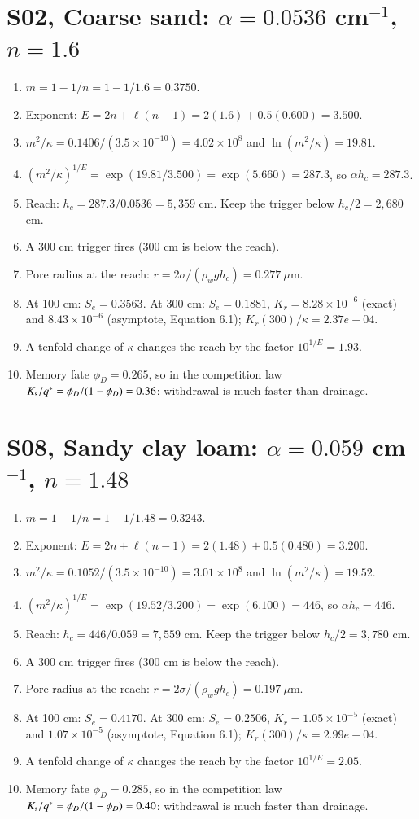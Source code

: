 \section{S02, Coarse sand: $\alpha=0.0536$ cm$^{-1}$, $n=1.6$}
\begin{enumerate}[leftmargin=*,itemsep=1pt]
\item $m=1-1/n=1-1/1.6=0.3750$.
\item Exponent: $E=2n+\ell(n-1)=2(1.6)+0.5(0.600)=3.500$.
\item $m^2/\kappa=0.1406/(3.5\times10^{-10})=4.02\times10^{8}$ and $\ln(m^2/\kappa)=19.81$.
\item $(m^2/\kappa)^{1/E}=\exp(19.81/3.500)=\exp(5.660)=287.3$, so $\alpha h_c=287.3$.
\item Reach: $h_c=287.3/0.0536=5,359$ cm. Keep the trigger below $h_c/2=2,680$ cm.
\item A 300 cm trigger fires (300 cm is below the reach).
\item Pore radius at the reach: $r=2\sigma/(\rho_wgh_c)=0.277\ \mu$m.
\item At 100 cm: $S_e=0.3563$. At 300 cm: $S_e=0.1881$, $K_r=8.28\times10^{-6}$ (exact) and $8.43\times10^{-6}$ (asymptote, Equation 6.1); $K_r(300)/\kappa=2.37e+04$.
\item A tenfold change of $\kappa$ changes the reach by the factor $10^{1/E}=1.93$.
\item Memory fate $\phi_D=0.265$, so in the competition law $K_{\mathrm s}/q^*=\phi_D/(1-\phi_D)=0.36$: withdrawal is much faster than drainage.
\end{enumerate}
\section{S08, Sandy clay loam: $\alpha=0.059$ cm$^{-1}$, $n=1.48$}
\begin{enumerate}[leftmargin=*,itemsep=1pt]
\item $m=1-1/n=1-1/1.48=0.3243$.
\item Exponent: $E=2n+\ell(n-1)=2(1.48)+0.5(0.480)=3.200$.
\item $m^2/\kappa=0.1052/(3.5\times10^{-10})=3.01\times10^{8}$ and $\ln(m^2/\kappa)=19.52$.
\item $(m^2/\kappa)^{1/E}=\exp(19.52/3.200)=\exp(6.100)=446$, so $\alpha h_c=446$.
\item Reach: $h_c=446/0.059=7,559$ cm. Keep the trigger below $h_c/2=3,780$ cm.
\item A 300 cm trigger fires (300 cm is below the reach).
\item Pore radius at the reach: $r=2\sigma/(\rho_wgh_c)=0.197\ \mu$m.
\item At 100 cm: $S_e=0.4170$. At 300 cm: $S_e=0.2506$, $K_r=1.05\times10^{-5}$ (exact) and $1.07\times10^{-5}$ (asymptote, Equation 6.1); $K_r(300)/\kappa=2.99e+04$.
\item A tenfold change of $\kappa$ changes the reach by the factor $10^{1/E}=2.05$.
\item Memory fate $\phi_D=0.285$, so in the competition law $K_{\mathrm s}/q^*=\phi_D/(1-\phi_D)=0.40$: withdrawal is much faster than drainage.
\end{enumerate}
